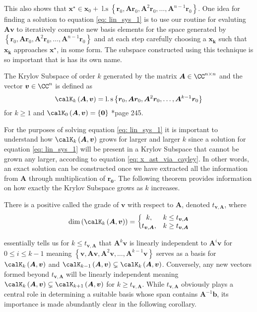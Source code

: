 This also shows that $\bm{x^{\star}} \in \bm{x}_0 + \operatorname{l.s} \left\{ \bm{r}_0, \bm{A} \bm{r}_0, \bm{A}^2 \bm{r}_0, \ldots , \bm{A}^{n-1} \bm{r}_0 \right\}$. One idea for finding a solution to equation \ref{eq: lin_sys_1} is to use our routine for evaluting $\bm{A} \bm{v}$ to iteratively compute new basis elements for the space generated by $\left\{ \bm{r}_0, \bm{A} \bm{r}_0, \bm{A}^2 \bm{r}_0, \ldots , \bm{A}^{n-1} \bm{r}_0 \right\}$ and at each step carefully choosing a $\bm{x_k}$ such that $\bm{x_k}$ approaches $\bm{x^{\star}}$, in some form. The subspace constructed using this technique is so important that is has its own name.
\begin{defe} \label{defe: krylov_subspace}
    The Krylov Subspace of order $k$ generated by the matrix $\bm{A} \in \CC^{n \times n}$ and the vector $\bm{v} \in \CC^{n}$ is defined as
    \[
        \calK_{k} \left( \bm{A},\bm{v} \right) = \operatorname{l.s} \left\{ \bm{r}_0, \bm{A} \bm{r}_0, \bm{A}^2 \bm{r}_0, \ldots , \bm{A}^{k-1} \bm{r}_0 \right\}
    \]
    for $k \geq 1$ and $\calK_{0} \left( \bm{A},\bm{v} \right) = \left\{ \bm{0} \right\}$ \cite{TrefethenLloydN.LloydNicholas1997Nla/}*{page 245}.
\end{defe}
For the purposes of solving equation \ref{eq: lin_sys_1} it is important to understand how $\calK_{k} \left( \bm{A},\bm{v} \right)$ grows for larger and larger $k$ since a solution for equation \ref{eq: lin_sys_1} will be present in a Krylov Subspace that cannot be grown any larger, according to equation \ref{eq: x_ast_via_cayley}. In other words, an exact solution can be constructed once we have extracted all the information from $\bm{A}$ through multiplication of $\bm{r_0}$. The following theorem provides information on how exactly the Krylov Subspace grows as $k$ increases.
\begin{thm} \label{theorem: grade_of_v}
    There is a positive called the grade of $\bm{v}$ with respect to $\bm{A}$, denoted $t_{\bm{v}, \bm{A}}$, where
    \[
        \operatorname{dim} \left( \calK_{k} \left( \bm{A} , \bm{v} \right) \right) = \left\{
        \begin{matrix}
            k,                  & k \leq t_{\bm{v}, \bm{A}} \\
            t_{\bm{v}, \bm{A}}, & k \geq t_{\bm{v}, \bm{A}}
        \end{matrix}
        \right.
    \]
\end{thm}
 essentially tells us for $k \leq t_{\bm{v}, \bm{A}}$ that $\bm{A}^k \bm{v}$ is linearly independent to $\bm{A}^i \bm{v}$ for $0 \leq i \leq k-1$ meaning $\left\{ \bm{v}, \bm{A} \bm{v}, \bm{A}^2 \bm{v}, \ldots , \bm{A}^{k-1} \bm{v} \right\}$ serves as a basis for $\calK_{k} \left( \bm{A},\bm{v} \right)$ and $\calK_{k-1} \left( \bm{A},\bm{v} \right) \subsetneq \calK_{k} \left( \bm{A},\bm{v} \right)$. Conversely, any new vectors formed beyond $t_{\bm{v}, \bm{A}}$ will be linearly independent meaning $\calK_{k} \left( \bm{A},\bm{v} \right) \subsetneq \calK_{k+1} \left( \bm{A},\bm{v} \right)$ for $k \geq t_{\bm{v}, \bm{A}}$. While $t_{\bm{v}, \bm{A}}$ obviously plays a central role in determining a suitable basis whose span contains $\bm{A}^{-1} \bm{b}$, its importance is made abundantly clear in the following corollary.
